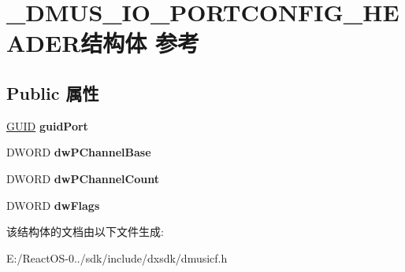 \hypertarget{struct___d_m_u_s___i_o___p_o_r_t_c_o_n_f_i_g___h_e_a_d_e_r}{}\section{\+\_\+\+D\+M\+U\+S\+\_\+\+I\+O\+\_\+\+P\+O\+R\+T\+C\+O\+N\+F\+I\+G\+\_\+\+H\+E\+A\+D\+E\+R结构体 参考}
\label{struct___d_m_u_s___i_o___p_o_r_t_c_o_n_f_i_g___h_e_a_d_e_r}
\subsection*{Public 属性}
\begin{DoxyCompactItemize}
\item 
\mbox{\label{struct___d_m_u_s___i_o___p_o_r_t_c_o_n_f_i_g___h_e_a_d_e_r_aed2c343a2e97c43c1eac0b4af28e20a0}} 
\hyperlink{interface_g_u_i_d}{G\+U\+ID} {\bfseries guid\+Port}
\item 
\mbox{\label{struct___d_m_u_s___i_o___p_o_r_t_c_o_n_f_i_g___h_e_a_d_e_r_a662eeeccb633a0345a81bc6e6a232cf3}} 
D\+W\+O\+RD {\bfseries dw\+P\+Channel\+Base}
\item 
\mbox{\label{struct___d_m_u_s___i_o___p_o_r_t_c_o_n_f_i_g___h_e_a_d_e_r_a46544948aad291df3dd7f263d28eb6c3}} 
D\+W\+O\+RD {\bfseries dw\+P\+Channel\+Count}
\item 
\mbox{\label{struct___d_m_u_s___i_o___p_o_r_t_c_o_n_f_i_g___h_e_a_d_e_r_a0889708f941c7306b958317973615792}} 
D\+W\+O\+RD {\bfseries dw\+Flags}
\end{DoxyCompactItemize}


该结构体的文档由以下文件生成\+:\begin{DoxyCompactItemize}
\item 
E\+:/\+React\+O\+S-\/0../sdk/include/dxsdk/dmusicf.\+h\end{DoxyCompactItemize}
